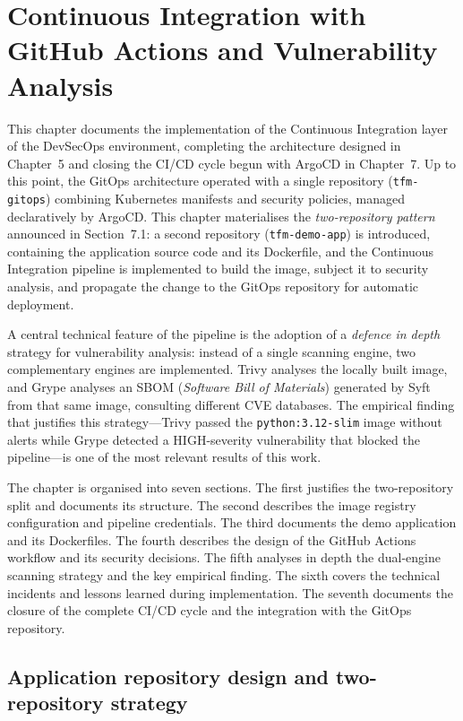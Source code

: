 \chapter{Continuous Integration with GitHub Actions and Vulnerability Analysis}

This chapter documents the implementation of the Continuous Integration layer of the DevSecOps environment, completing the architecture designed in Chapter~5 and closing the CI/CD cycle begun with ArgoCD in Chapter~7. Up to this point, the GitOps architecture operated with a single repository (\texttt{tfm-gitops}) combining Kubernetes manifests and security policies, managed declaratively by ArgoCD. This chapter materialises the \textit{two-repository pattern} announced in Section~7.1: a second repository (\texttt{tfm-demo-app}) is introduced, containing the application source code and its Dockerfile, and the Continuous Integration pipeline is implemented to build the image, subject it to security analysis, and propagate the change to the GitOps repository for automatic deployment.

A central technical feature of the pipeline is the adoption of a \textit{defence in depth} strategy for vulnerability analysis: instead of a single scanning engine, two complementary engines are implemented. Trivy \cite{trivy_docs} analyses the locally built image, and Grype \cite{grype_docs} analyses an SBOM (\textit{Software Bill of Materials}) \cite{syft_docs} generated by Syft from that same image, consulting different CVE databases. The empirical finding that justifies this strategy---Trivy passed the \texttt{python:3.12-slim} image without alerts while Grype detected a HIGH-severity vulnerability that blocked the pipeline---is one of the most relevant results of this work.

The chapter is organised into seven sections. The first justifies the two-repository split and documents its structure. The second describes the image registry configuration and pipeline credentials. The third documents the demo application and its Dockerfiles. The fourth describes the design of the GitHub Actions workflow and its security decisions. The fifth analyses in depth the dual-engine scanning strategy and the key empirical finding. The sixth covers the technical incidents and lessons learned during implementation. The seventh documents the closure of the complete CI/CD cycle and the integration with the GitOps repository.

\section{Application repository design and two-repository strategy}

